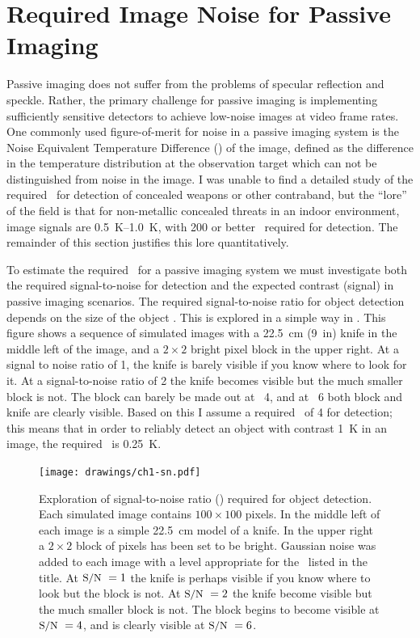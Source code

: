 \section{Required Image Noise for Passive Imaging} \label{sec:ch1-netd-reqs}

Passive imaging does not suffer from the problems of specular reflection and speckle.
Rather, the primary challenge for passive imaging is implementing sufficiently sensitive detectors to achieve low-noise images at video frame rates.
One commonly used figure-of-merit for noise in a passive imaging system is the Noise Equivalent Temperature Difference (\NETD) of the image, defined as the difference in the temperature distribution at the observation target which can not be distinguished from noise in the image.
I was unable to find a detailed study of the required \NETD\ for detection of concealed weapons or other contraband, but the ``lore'' of the field is that for non-metallic concealed threats in an indoor environment, image signals are \SIrange{0.5}{1.0}{\K}, with \SI{200}{\mK} or  better \NETD\ required for detection.
The remainder of this section justifies this lore quantitatively.

To estimate the required \NETD\ for a passive imaging system we must investigate both the required signal-to-noise for detection and the expected contrast (signal) in passive imaging scenarios.
The required signal-to-noise ratio for object detection depends on the size of the object \cite{steven_w._smith_scientist_1997}.
This is explored in a simple way in .
This figure shows a sequence of simulated images with a \SI{22.5}{\cm} (\SI{9}{in}) knife in the middle left of the image, and a $2\times2$ bright pixel block in the upper right.
At a signal to noise ratio of 1, the knife is barely visible if you know where to look for it.
At a signal-to-noise ratio of 2 the knife becomes visible but the much smaller block is not.
The block can barely be made out at \SN\ 4, and at \SN\ 6 both block and knife are clearly visible.
Based on this I assume a required \SN\  of 4 for detection; this means that in order to reliably detect an object with contrast \SI{1}{\K} in an image, the required \NETD\ is \SI{0.25}{\K}.

\begin{figure}
\centering
\texttt{[image: drawings/ch1-sn.pdf]}
\caption[Signal-to-noise ratio for object detection]{
  Exploration of signal-to-noise ratio (\SN) required for object detection.
  Each simulated image contains $100 \times 100$ pixels.
  In the middle left of each image is a simple \SI{22.5}{\cm} model of a knife.
  In the upper right a $2\times2$ block of pixels has been set to be bright.
  Gaussian noise was added to each image with a level appropriate for the \SN\ listed in the title.
  At $\text{\small{S/N}}\ = 1$ the knife is perhaps visible if you know where to look but the block is not.
  At $\text{\small{S/N}}\ = 2$ the knife become visible but the much smaller block is not.
  The block begins to become visible at $\text{\small{S/N}}\ = 4$, and is clearly visible at $\text{\small{S/N}}\ = 6$.
}
\label{fig:ch1-sn}
\end{figure}

